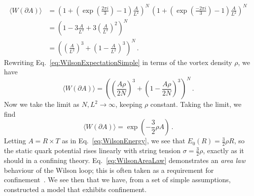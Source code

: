 %
\begin{align}
\langle W(\partial A)\rangle &=\left(1+\left(\exp\left(\frac{2\pi i}{3}\right) - 1\right)\frac{A}{L^2}\right)^N\, \left(1+\left(\exp\left(\frac{-2\pi i}{3}\right) - 1\right)\frac{A}{L^2}\right)^N\nonumber\\
&=\left(1 -3\frac{A}{L^2} + 3\left(\frac{A}{L^2}\right)^2\right)^N\nonumber\\
&= \left(\left(\frac{A}{L^2}\right)^3+\left(1-\frac{A}{L^2}\right)^3\right)^N\, .\label{eq:WilsonExpectationSimple}
\end{align}
%
Rewriting Eq.~\ref{eq:WilsonExpectationSimple} in terms of the vortex density $\rho$, we have
%
\begin{equation}
\langle W(\partial A)\rangle = \left(\left(\frac{A\rho}{2N}\right)^3+\left(1-\frac{A\rho}{2N}\right)^3\right)^N\, .
\end{equation}
%
Now we take the limit as $N,L^2\rightarrow\infty$, keeping $\rho$ constant. Taking the limit, we find
%
\begin{equation}
\langle W(\partial A)\rangle = \exp\left(-\frac{3}{2}\rho A\right)\, .
\label{eq:WilsonAreaLaw}
\end{equation}
%
Letting $A=R\times T$ as in Eq.~\ref{eq:WilsonEnergy}, we see that $E_0(R) = \frac{3}{2}\rho R$, so the static quark potential rises linearly with string tension $\sigma = \frac{3}{2}\rho$, exactly as it should in a confining theory. Eq.~\ref{eq:WilsonAreaLaw} demonstrates an {\it area law} behaviour of the Wilson loop; this is often taken as a requirement for confinement~\cite{DelDebbio:1998luz,Dosch:1988ha}. We see then that we have, from a set of simple assumptions, constructed a model that exhibits confinement.\\

